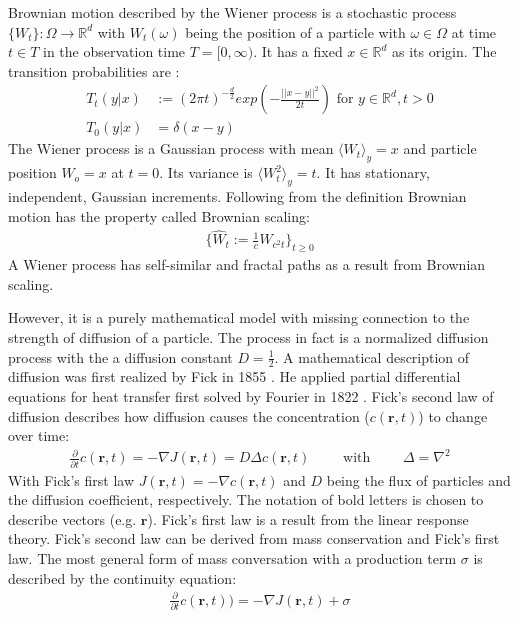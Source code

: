 \documentclass[
  a4paper,BCOR10mm,oneside,
  headsepline,footsepline,%
  fleqn,openbib
]{scrbook}
\begin{document}
Brownian motion described by the Wiener process is a stochastic process $ \{ W_t \}: \Omega \rightarrow \mathbb{R}^d$ with $ W_t(\omega)$ being the position of a particle with $\omega \in \Omega$ at time $t \in T$ in the observation time $T =[0, \infty)$. It has a fixed $x \in \mathbb{R}^d$ as its origin. The transition probabilities are \cite{LectureFelix}: 
\begin{align}
T_{t}(y|x) & := (2 \pi t)^{- \frac{d}{2}} exp \left(- \frac{||x-y||^2}{2 t}\right) \text{ for } y \in \mathbb{R}^d, t>0 \\ \nonumber
T_{0}(y|x) & = \delta(x-y) 
\end{align}
The Wiener process is a Gaussian process with mean $\langle W_t \rangle_y=x$ and particle position $W_o=x$ at $t=0$. Its variance is $\langle W^2_t \rangle_y= t$. It has stationary, independent, Gaussian increments. Following from the definition Brownian motion has the property called Brownian scaling:
\begin{align}
\label{Brownianscaling}
\{\hat{W}_t := \frac{1}{c} W_{c^2 t} \}_{t\geq0} 
\end{align}
A Wiener process has self-similar and fractal paths as a result from Brownian scaling.\par\bigskip
However, it is a purely mathematical model with missing connection to the strength of diffusion of a particle. The process in fact is a normalized diffusion process with the a diffusion constant $D=\frac{1}{2}$. A mathematical description of diffusion was first realized by Fick in 1855 \cite{Fick1855}. He applied partial differential equations for heat transfer first solved by Fourier in 1822 \cite{Fourier1822}. Fick's  second law of diffusion describes how diffusion causes the concentration ($c(\bm{r},t)$) to change over time:
\begin{align}
 \frac{\partial}{\partial t} c(\bm{r},t) = - \nabla J (\bm{r},t) = D  \Delta c(\bm{r},t) \qquad \text{ with } \qquad \Delta= \nabla^2  \label{eq:ficks}
\end{align}
With Fick's first law $J(\bm{r},t)=- \nabla c(\bm{r},t)$ and $D$ being the flux of particles and the diffusion coefficient, respectively. The notation of bold letters is chosen to describe vectors (e.g. $\bm{r}$). Fick's first law is a result from the linear response theory. Fick's second law can be derived from mass conservation and Fick's first law. The most general form of mass conversation with a production term $\sigma$ is described by the continuity equation:
\begin{align} \label{continuity}
\frac{\partial}{\partial t} c(\bm{r},t))=- \nabla J(\bm{r},t)+ \sigma 
\end{align}
\end{document}
